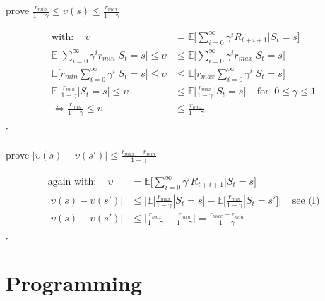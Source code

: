 \documentclass[11pt,a4paper]{article}
\begin{document}
prove $\frac{r_{min}}{1-\gamma} \leq \upsilon(s) \leq \frac{r_{max}}{1-\gamma}$

\begin{align*}
    \text{with: } \;\;\; \upsilon &= \mathbb{E} \biggl[ \sum_{i=0}^{\infty}\gamma^{i}R_{t+i+1} | S_{t}=s \biggr]\\
    \mathbb{E} \biggl[ \sum_{i=0}^{\infty}\gamma^{i}r_{min} | S_{t}=s \biggr] \leq \upsilon &\leq
    \mathbb{E} \biggl[ \sum_{i=0}^{\infty}\gamma^{i}r_{max} | S_{t}=s \biggr]\\
    \mathbb{E} \biggl[ r_{min}\sum_{i=0}^{\infty}\gamma^{i} | S_{t}=s \biggr] \leq \upsilon &\leq
    \mathbb{E} \biggl[ r_{max}\sum_{i=0}^{\infty}\gamma^{i} | S_{t}=s \biggr]\\
    \mathbb{E} \biggl[ \frac{r_{min}}{1-\gamma} | S_{t}=s \biggr] \leq \upsilon &\leq
    \mathbb{E} \biggl[ \frac{r_{max}}{1-\gamma} | S_{t}=s \biggr] \;\;\;\; \text{for} \;\; 0\leq\gamma\leq 1\\
    \Leftrightarrow \frac{r_{min}}{1-\gamma} \leq \upsilon &\leq \frac{r_{max}}{1-\gamma}
\end{align*}

\flushright $\square$
\flushleft

\subsubsection{}

prove $|\upsilon(s) - \upsilon(s')| \leq \frac{r_{max} - r_{min}}{1-\gamma}$

\begin{align*}
    \text{again with: } \;\;\; \upsilon &= \mathbb{E} \biggl[ \sum_{i=0}^{\infty}\gamma^{i}R_{t+i+1} | S_{t}=s \biggr]\\
    |\upsilon(s) - \upsilon(s')| &\leq 
    \biggl|\mathbb{E} \bigl[ \frac{r_{max}}{1-\gamma} | S_{t}=s \bigr]
    - \mathbb{E} \bigl[ \frac{r_{min}}{1-\gamma} | S_{t}=s' \bigr]\biggr|
    \;\;\;\; \text{see (I)}\\ 
    |\upsilon(s) - \upsilon(s')| &\leq 
    \biggl|\frac{r_{max}}{1-\gamma} - \frac{r_{min}}{1-\gamma}\biggr|
    = \frac{r_{max} - r_{min}}{1-\gamma}
\end{align*}

\flushright $\square$
\flushleft

\section{Programming}
\end{document}
